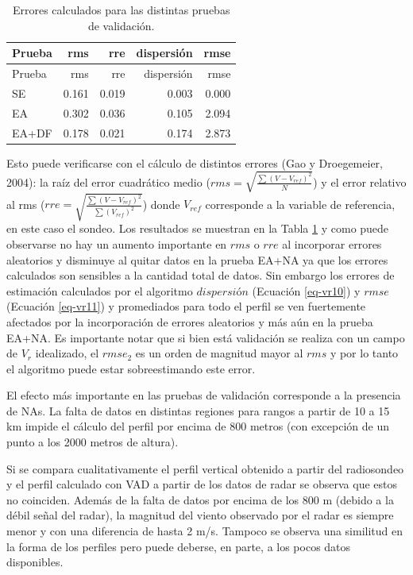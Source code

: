 \documentclass[12pt,spanish,oneside, a4paper]{book}
\begin{document}
\begin{longtable}[]{@{}lrrrr@{}}
\caption{Errores calculados para las distintas pruebas de validación.
\label{validacion-errores}}\tabularnewline
\toprule
Prueba & rms & rre & dispersión & rmse\tabularnewline
\midrule
\endfirsthead
\toprule
Prueba & rms & rre & dispersión & rmse\tabularnewline
\midrule
\endhead
SE & 0.161 & 0.019 & 0.003 & 0.000\tabularnewline
EA & 0.302 & 0.036 & 0.105 & 2.094\tabularnewline
EA+DF & 0.178 & 0.021 & 0.174 & 2.873\tabularnewline
\bottomrule
\end{longtable}

\newpage

Esto puede verificarse con el cálculo de distintos errores (Gao y
Droegemeier, 2004): la raíz del error cuadrático medio
(\(rms = \sqrt{ \frac{\sum (V-V_{ref})^2}{N} }\)) y el error relativo al
rms (\(rre = \sqrt{ \frac{\sum (V-V_{ref})^2}{\sum (V_{ref})^2} }\))
donde \(V_{ref}\) corresponde a la variable de referencia, en este caso
el sondeo. Los resultados se muestran en la Tabla
\ref{validacion-errores} y como puede observarse no hay un aumento
importante en \(rms\) o \(rre\) al incorporar errores aleatorios y
disminuye al quitar datos en la prueba EA+NA ya que los errores
calculados son sensibles a la cantidad total de datos. Sin embargo los
errores de estimación calculados por el algoritmo \(dispersión\)
(Ecuación \ref{eq-vr10}) y \(rmse\) (Ecuación \ref{eq-vr11}) y
promediados para todo el perfil se ven fuertemente afectados por la
incorporación de errores aleatorios y más aún en la prueba EA+NA. Es
importante notar que si bien está validación se realiza con un campo de
\(V_r\) idealizado, el \(rmse_2\) es un orden de magnitud mayor al
\(rms\) y por lo tanto el algoritmo puede estar sobreestimando este
error.

El efecto más importante en las pruebas de validación corresponde a la
presencia de NAs. La falta de datos en distintas regiones para rangos a
partir de 10 a 15 km impide el cálculo del perfil por encima de 800
metros (con excepción de un punto a los 2000 metros de altura).

Si se compara cualitativamente el perfil vertical obtenido a partir del
radiosondeo y el perfil calculado con VAD a partir de los datos de radar
se observa que estos no coinciden. Además de la falta de datos por
encima de los 800 m (debido a la débil señal del radar), la magnitud del
viento observado por el radar es siempre menor y con una diferencia de
hasta 2 m/s. Tampoco se observa una similitud en la forma de los
perfiles pero puede deberse, en parte, a los pocos datos disponibles.
\end{document}
